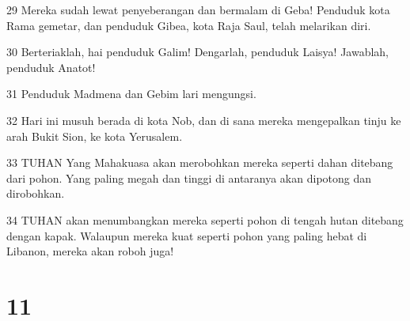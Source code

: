 \par 29 Mereka sudah lewat penyeberangan dan bermalam di Geba! Penduduk kota Rama gemetar, dan penduduk Gibea, kota Raja Saul, telah melarikan diri.
\par 30 Berteriaklah, hai penduduk Galim! Dengarlah, penduduk Laisya! Jawablah, penduduk Anatot!
\par 31 Penduduk Madmena dan Gebim lari mengungsi.
\par 32 Hari ini musuh berada di kota Nob, dan di sana mereka mengepalkan tinju ke arah Bukit Sion, ke kota Yerusalem.
\par 33 TUHAN Yang Mahakuasa akan merobohkan mereka seperti dahan ditebang dari pohon. Yang paling megah dan tinggi di antaranya akan dipotong dan dirobohkan.
\par 34 TUHAN akan menumbangkan mereka seperti pohon di tengah hutan ditebang dengan kapak. Walaupun mereka kuat seperti pohon yang paling hebat di Libanon, mereka akan roboh juga!

\chapter{11}

